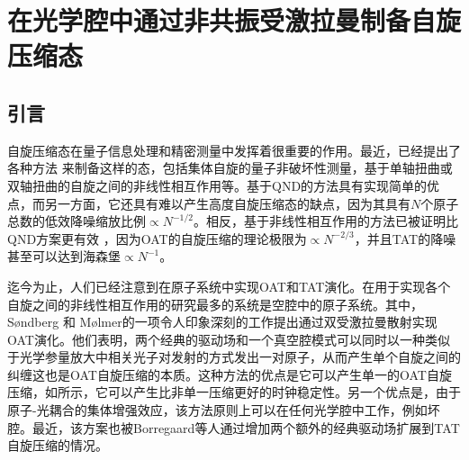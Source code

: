 
\chapter{在光学腔中通过非共振受激拉曼制备自旋压缩态}\label{chapter3}
\vbox{}\vbox{}
\section{引言}
\vbox{}



自旋压缩态\cite{PRA1993Kitagawa}在量子信息处理\cite{JPB2008qf,JPA2014qf,Teles2015}和精密测量\cite{PRA2007pm,PRL2011pm,PRL2016pm}中发挥着很重要的作用。最近，已经提出了各种方法\cite{PRA2002SS,PRA2012LI,PRL2013DT,NJP2017J-Borregaard,PRA2017Wang,NJP2010ex,PRL2010ex} 来制备这样的态，包括集体自旋的量子非破坏性测量\cite{NJP1998qnd,PRA1999qnd,PRL2000qnd,PRL2000Duan,PRL2016qnd}，基于单轴扭曲\cite{PRA1993Kitagawa,PRA2002SS}或双轴扭曲\cite{PRA2017Wang,NJP2017J-Borregaard}的自旋之间的非线性相互作用等。基于QND的方法具有实现简单的优点，而另一方面，它还具有难以产生高度自旋压缩态的缺点，因为其具有$N$个原子总数的低效降噪缩放比例$\propto N^{-1/2}$。相反，基于非线性相互作用的方法已被证明比QND方案更有效 \cite{PRA1993Kitagawa}，因为OAT的自旋压缩的理论极限为$\propto N^{-2/3}$，并且TAT的降噪甚至可以达到海森堡$\propto N^{-1}$。

迄今为止，人们已经注意到在原子系统中实现OAT和TAT演化。在用于实现各个自旋之间的非线性相互作用的研究最多的系统是空腔中的原子系统\cite{PRA2002SS,NJP2017J-Borregaard,PhysRevA.89.023838,PhysRevLett.110.120402,PhysRevA.86.013828,PhysRevA.77.063811,PhysRevA.75.013804,PhysRevLett.88.243602}。其中，S\o{}ndberg 和 M\o{}lmer的一项令人印象深刻的工作提出通过双受激拉曼散射实现OAT演化\cite{PRA2002SS}。他们表明，两个经典的驱动场和一个真空腔模式可以同时以一种类似于光学参量放大中相关光子对发射的方式发出一对原子，从而产生单个自旋之间的纠缠这也是OAT自旋压缩的本质。这种方法的优点是它可以产生单一的OAT自旋压缩，如\cite{Braverman_2018}所示，它可以产生比非单一压缩更好的时钟稳定性。另一个优点是，由于原子-光耦合\cite{PhysRevLett.84.4232,PhysRevLett.86.783}的集体增强效应，该方法原则上可以在任何光学腔中工作，例如坏腔。最近，该方案也被Borregaard等人\cite{NJP2017J-Borregaard}通过增加两个额外的经典驱动场扩展到TAT自旋压缩的情况。

